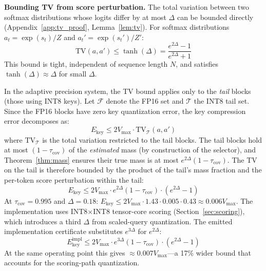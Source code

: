 \documentclass[10pt,twocolumn,a4paper]{article}
\theoremstyle{definition}
\theoremstyle{remark}
\begin{document}
\textbf{Bounding TV from score perturbation.}  The total variation between two softmax distributions whose logits differ by at most $\Delta$ can be bounded directly (Appendix~\ref{app:tv_proof}, Lemma~\ref{lem:tv}).  For softmax distributions $a_t = \exp(s_t) / Z$ and $a_t' = \exp(s_t') / Z'$:
\begin{equation}
\label{eq:tv_bound}
  \mathrm{TV}(a, a') \leq \tanh(\Delta) = \frac{e^{2\Delta} - 1}{e^{2\Delta} + 1}
\end{equation}
This bound is tight, independent of sequence length $N$, and satisfies $\tanh(\Delta) \approx \Delta$ for small $\Delta$.

In the adaptive precision system, the TV bound applies only to the \emph{tail} blocks (those using INT8 keys).  Let $\mathcal{F}$ denote the FP16 set and $\mathcal{T}$ the INT8 tail set.  Since the FP16 blocks have zero key quantization error, the key compression error decomposes as:
\begin{equation}
  E_{\mathrm{key}} \leq 2 V_{\max} \cdot \mathrm{TV}_{\mathcal{T}}(a, a')
\end{equation}
where $\mathrm{TV}_{\mathcal{T}}$ is the total variation restricted to the tail blocks.  The tail blocks hold at most $(1 - \tau_{\mathrm{cov}})$ of the \emph{estimated} mass (by construction of the selector), and Theorem~\ref{thm:mass} ensures their true mass is at most $e^{2\Delta}(1 - \tau_{\mathrm{cov}})$.  The TV on the tail is therefore bounded by the product of the tail's mass fraction and the per-token score perturbation within the tail:
\begin{equation}
  E_{\mathrm{key}} \leq 2 V_{\max} \cdot e^{2\Delta} (1 - \tau_{\mathrm{cov}}) \cdot (e^{2\Delta} - 1)
\end{equation}
At $\tau_{\mathrm{cov}} = 0.995$ and $\Delta = 0.18$: $E_{\mathrm{key}} \leq 2 V_{\max} \cdot 1.43 \cdot 0.005 \cdot 0.43 \approx 0.006 V_{\max}$.  The implementation uses INT8$\times$INT8 tensor-core scoring (Section~\ref{sec:scoring}), which introduces a third $\Delta$ from scaled-query quantization.  The emitted implementation certificate substitutes $e^{3\Delta}$ for $e^{2\Delta}$:
\begin{equation}
\label{eq:impl_key}
  E_{\mathrm{key}}^{\mathrm{impl}} \leq 2 V_{\max} \cdot e^{3\Delta} (1 - \tau_{\mathrm{cov}}) \cdot (e^{2\Delta} - 1)
\end{equation}
At the same operating point this gives $\approx 0.007 V_{\max}$---a 17\% wider bound that accounts for the scoring-path quantization.
\end{document}
